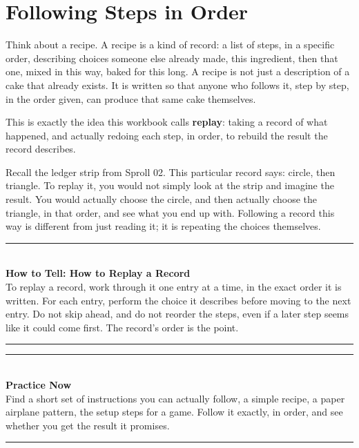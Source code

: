 \documentclass[11pt]{book}
\newenvironment{algorithmproc}[1]{%
\vspace{0.6em}\noindent\rule{\linewidth}{0.6pt}\\[0.2em]\textbf{How to Tell: #1}\\[0.3em]}%
{\\[0.2em]\noindent\rule{\linewidth}{0.6pt}\vspace{0.6em}}
\newenvironment{practicenow}{%
\vspace{0.6em}\noindent\rule{\linewidth}{0.6pt}\\[0.2em]\textbf{Practice Now}\\[0.3em]}%
{\\[0.2em]\noindent\rule{\linewidth}{0.6pt}\vspace{0.6em}}
\begin{document}
\section{Following Steps in Order}

Think about a recipe. A recipe is a kind of record: a list of steps, in a specific order, describing choices someone else already made, this ingredient, then that one, mixed in this way, baked for this long. A recipe is not just a description of a cake that already exists. It is written so that anyone who follows it, step by step, in the order given, can produce that same cake themselves.

This is exactly the idea this workbook calls \textbf{replay}: taking a record of what happened, and actually redoing each step, in order, to rebuild the result the record describes.

\begin{center}
\end{center}

Recall the ledger strip from Sproll 02. This particular record says: circle, then triangle. To replay it, you would not simply look at the strip and imagine the result. You would actually choose the circle, and then actually choose the triangle, in that order, and see what you end up with. Following a record this way is different from just reading it; it is repeating the choices themselves.

\begin{algorithmproc}{How to Replay a Record}
To replay a record, work through it one entry at a time, in the exact order it is written. For each entry, perform the choice it describes before moving to the next entry. Do not skip ahead, and do not reorder the steps, even if a later step seems like it could come first. The record's order is the point.
\end{algorithmproc}

\begin{practicenow}
Find a short set of instructions you can actually follow, a simple recipe, a paper airplane pattern, the setup steps for a game. Follow it exactly, in order, and see whether you get the result it promises.
\end{practicenow}
\end{document}
